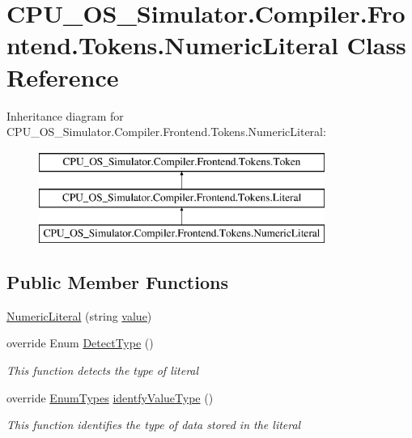 \hypertarget{class_c_p_u___o_s___simulator_1_1_compiler_1_1_frontend_1_1_tokens_1_1_numeric_literal}{}\section{C\+P\+U\+\_\+\+O\+S\+\_\+\+Simulator.\+Compiler.\+Frontend.\+Tokens.\+Numeric\+Literal Class Reference}
\label{class_c_p_u___o_s___simulator_1_1_compiler_1_1_frontend_1_1_tokens_1_1_numeric_literal}
Inheritance diagram for C\+P\+U\+\_\+\+O\+S\+\_\+\+Simulator.\+Compiler.\+Frontend.\+Tokens.\+Numeric\+Literal\+:\begin{figure}[H]
\begin{center}
\leavevmode
\includegraphics[height=3.000000cm]{class_c_p_u___o_s___simulator_1_1_compiler_1_1_frontend_1_1_tokens_1_1_numeric_literal}
\end{center}
\end{figure}
\subsection*{Public Member Functions}
\begin{DoxyCompactItemize}
\item 
\hyperlink{class_c_p_u___o_s___simulator_1_1_compiler_1_1_frontend_1_1_tokens_1_1_numeric_literal_a215f0217faf01222acfd4cf6a38a8e1b}{Numeric\+Literal} (string \hyperlink{class_c_p_u___o_s___simulator_1_1_compiler_1_1_frontend_1_1_tokens_1_1_token_a5c05e12850ca18be8cbfdf7e2e263324}{value})
\item 
override Enum \hyperlink{class_c_p_u___o_s___simulator_1_1_compiler_1_1_frontend_1_1_tokens_1_1_numeric_literal_a48f7635001171a738d1c53d065659933}{Detect\+Type} ()
\begin{DoxyCompactList}\small\item\em This function detects the type of literal \end{DoxyCompactList}\item 
override \hyperlink{namespace_c_p_u___o_s___simulator_1_1_compiler_1_1_frontend_1_1_tokens_a7c0cc43763cc9d01c7d5af34d70b96ea}{Enum\+Types} \hyperlink{class_c_p_u___o_s___simulator_1_1_compiler_1_1_frontend_1_1_tokens_1_1_numeric_literal_ac00d8a0002a5a291fba5713d385d11a6}{identfy\+Value\+Type} ()
\begin{DoxyCompactList}\small\item\em This function identifies the type of data stored in the literal \end{DoxyCompactList}\end{DoxyCompactItemize}
